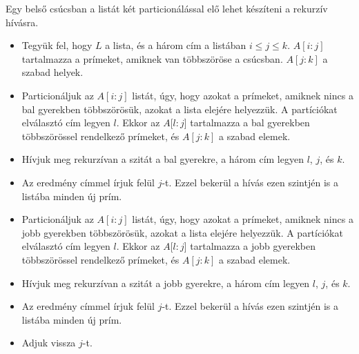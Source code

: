 \documentclass[12pt]{report}
\begin{document}
Egy belső csúcsban a listát két particionálással elő lehet készíteni a rekurzív hívásra.
\begin{itemize}
\item Tegyük fel, hogy $L$ a lista, és a három cím a listában $i \le j \le k$.
$A[i:j]$ tartalmazza a prímeket, amiknek van többszöröse a csúcsban.
$A[j:k]$ a szabad helyek.
\item Particionáljuk az $A[i:j]$ listát, úgy, hogy azokat a prímeket,
amiknek nincs a bal gyerekben többszörösük,
azokat a lista elejére helyezzük.
A partíciókat elválasztó cím legyen $l$.
Ekkor az $A[l:j$] tartalmazza a bal gyerekben többszörössel rendelkező prímeket,
és $A[j:k]$ a szabad elemek.
\item Hívjuk meg rekurzívan a szitát a bal gyerekre, a három cím legyen $l$, $j$, és $k$.
\item Az eredmény címmel írjuk felül $j$-t.
Ezzel bekerül a hívás ezen szintjén is a listába minden új prím.
\item Particionáljuk az $A[i:j]$ listát, úgy, hogy azokat a prímeket,
amiknek nincs a jobb gyerekben többszörösük,
azokat a lista elejére helyezzük.
A partíciókat elválasztó cím legyen $l$.
Ekkor az $A[l:j$] tartalmazza a jobb gyerekben többszörössel rendelkező prímeket,
és $A[j:k]$ a szabad elemek.
\item Hívjuk meg rekurzívan a szitát a jobb gyerekre, a három cím legyen $l$, $j$, és $k$.
\item Az eredmény címmel írjuk felül $j$-t.
Ezzel bekerül a hívás ezen szintjén is a listába minden új prím.
\item Adjuk vissza $j$-t.
\end{itemize}
\end{document}
